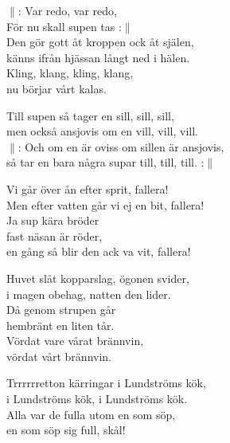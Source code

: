 \documentclass[a6paper,10pt]{article}
\begin{document}
\setlength{\oddsidemargin}{-0.37in}
\noindent
\begin{center}
\end{center}
$\|$: Var redo, var redo, \\
För nu skall supen tas :$\|$\\
Den gör gott åt kroppen ock åt själen, \\
känns ifrån hjässan långt ned i hälen. \\
Kling, klang, kling, klang, \\
nu börjar vårt kalas. 
\vspace{20pt}
\begin{center}
\end{center}
Till supen så tager en sill, sill, sill, \\
men också ansjovis om en vill, vill, vill. \\
$\|$: Och om en är oviss om sillen är ansjovis, \\
så tar en bara några supar till, till, till. :$\|$
\vspace{20pt}
\begin{center}
\end{center}
Vi går över ån efter sprit, fallera!\\
Men efter vatten går vi ej en bit, fallera!\\
Ja sup kära bröder\\
fast näsan är röder,\\
en gång så blir den ack va vit, fallera!

\newpage
\setlength{\oddsidemargin}{-0.47in}
\noindent
\begin{center}
\end{center}
Huvet slåt kopparslag, ögonen svider,\\
i magen obehag, natten den lider.\\
Då genom strupen går\\
hembränt en liten tår.\\
Vördat vare vårat brännvin,\\
vördat vårt brännvin.
\vspace{40pt}
\begin{center}
\end{center}
Trrrrrretton kärringar i Lundströms kök, \\
i Lundströms kök, i Lundströms kök. \\
Alla var de fulla utom en som söp, \\
en som söp sig full, skål! 
\end{document}
